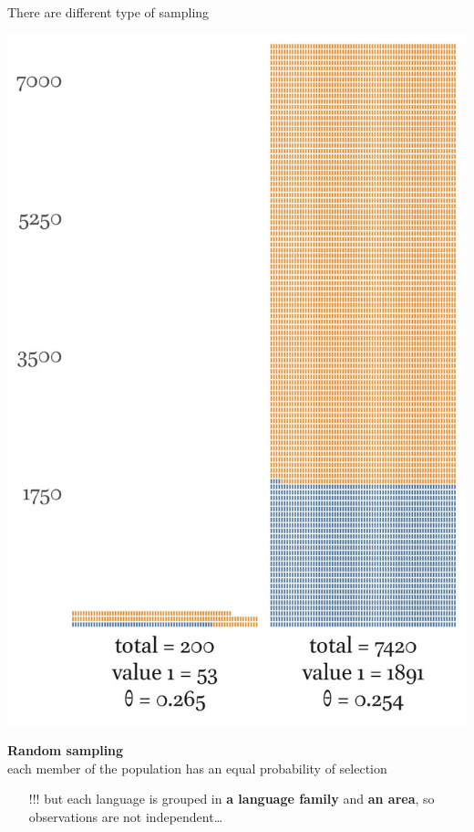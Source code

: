 \documentclass[13pt, t]{beamer}
\begin{document}
\begin{frame}{There are different type of sampling}
\begin{multicols}{2}
\includegraphics[width=\linewidth]{images/03_simple_sample}
\columnbreak

\textbf{Random sampling}\\
each member of the population has an equal probability of selection \pause\\
\begin{itemize}
\item[\color{colorblue}!!!] but each language is grouped in \textbf{a language family} and \textbf{an area}, so observations are not independent\dots
\end{itemize}

\end{multicols}
\end{frame}
\end{document}

